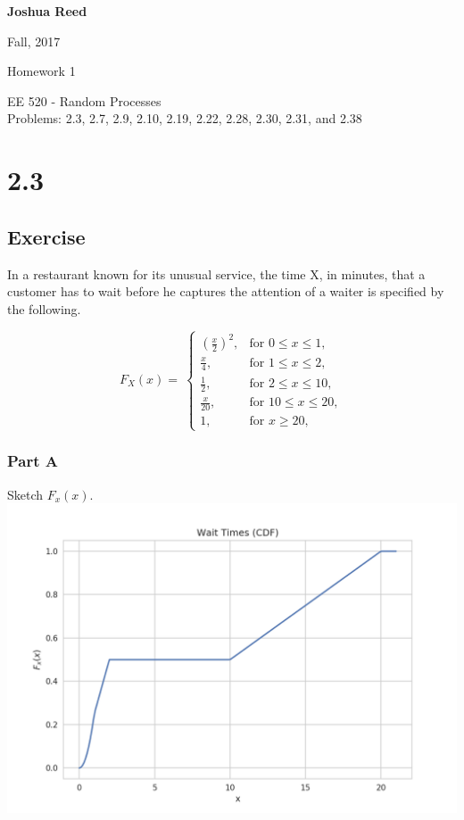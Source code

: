 \documentclass[12pt]{article}
\begin{document}
{%
  \large \bfseries 
  Joshua Reed

  Fall, 2017

  \begin{center}
    {\huge Homework 1}

    EE 520 - Random Processes \\%
  \normalsize Problems: 2.3, 2.7, 2.9, 2.10, 2.19, 2.22, 2.28, 2.30, 2.31, and 2.38
  \end{center}}
 
 
\section{2.3} 
\subsection{Exercise}
In a restaurant known for its unusual service, the time X, in minutes, that a customer has to wait
before he captures the attention of a waiter is specified by the following.

\begin{equation*}
  F_X(x)=\
    \begin{cases}
      (\frac{x}{2})^2, & \text{for }0\leq x \leq1,\\
      \frac{x}{4}, & \text{for }1\leq x \leq2,\\
      \frac{1}{2}, & \text{for }2\leq x \leq10,\\
      \frac{x}{20}, & \text{for }10\leq x \leq20,\\
      1, & \text{for }x\geq 20,
    \end{cases}
\end{equation*}

\subsubsection{Part A}
Sketch $F_x(x)$.
\includegraphics[scale=0.7]{plot-wait-times-cdf}
\end{document}
